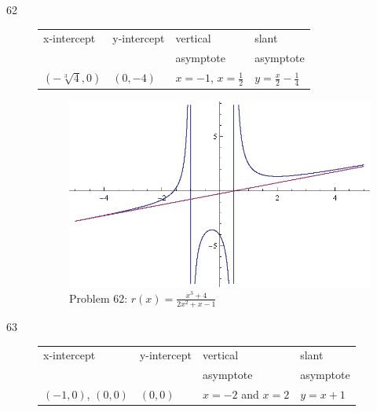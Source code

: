 \documentclass{exam}
\begin{document}
\begin{description}
    \item[62]
      \begin{tabular}{llll}
        \toprule
        x-intercept                        & y-intercept & vertical                    & slant \\
                                           &             & asymptote                   & asymptote \\
        \midrule
        $ \left( - \sqrt[3]{4}, 0 \right)$ & $(0, -4)$   & $x = -1$, $x = \frac{1}{2}$ & $y = \frac{x}{2} - \frac{1}{4}$ \\
        \bottomrule
      \end{tabular}

      \begin{figure}[H]
        \centering
        \includegraphics[scale = 0.8]{problem62.eps}
        \caption*{ Problem 62: $r(x) = \frac{x^3 + 4}{2x^2 + x - 1}$ }
      \end{figure}

    \item[63]
      \begin{tabular}{llll}
        \toprule
        x-intercept         & y-intercept & vertical    & slant \\
                            &             & asymptote   & asymptote \\
        \midrule
        $(-1, 0)$, $(0, 0)$ & $(0, 0)$    & $x = -2$ and $x = 2$ & $y = x + 1$ \\
        \bottomrule
      \end{tabular}


\end{description}
\end{document}
